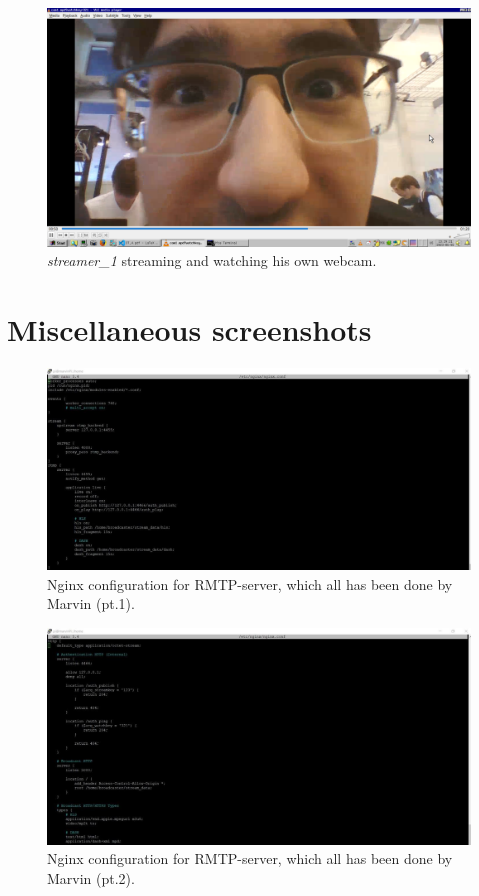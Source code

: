 \documentclass[a4paper,1pt]{article}
\begin{document}
\begin{figure}[H]
	\centering
	\includegraphics[width=\textwidth]{hello.png}
	\caption{\textit{streamer\_1} streaming and watching his own webcam.}
	\label{fig:webcam2}
\end{figure}


\section{Miscellaneous screenshots}
\begin{figure}[H]
	\centering
	\includegraphics[width=\textwidth]{n1.jpg}
	\caption{Nginx configuration for RMTP-server, which all has been done by Marvin (pt.1).}
	\label{fig:n1}
\end{figure}

\begin{figure}[H]
	\centering
	\includegraphics[width=\textwidth]{n2.jpg}
	\caption{Nginx configuration for RMTP-server, which all has been done by Marvin (pt.2).}
	\label{fig:n2}
\end{figure}
\end{document}
